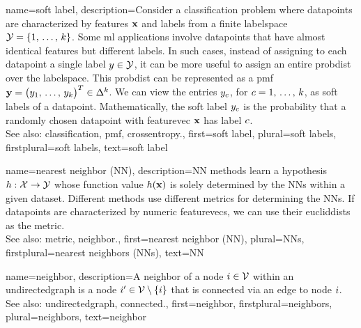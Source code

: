 {name={soft label},
	description={Consider a \gls{classification} problem where \glspl{datapoint} are characterized 
 		by \glspl{feature} ${\bf x}$ and \glspl{label} from a finite \gls{labelspace} 
		$\mathcal{Y} = \{1,\,\ldots,\,k\}$. Some \gls{ml} applications involve \glspl{datapoint} 
		that have almost identical \glspl{feature} but different \glspl{label}. In such 
		cases, instead of assigning to each \gls{datapoint} a single \gls{label} $y \in \mathcal{Y}$, 
		it can be more useful to assign an entire \gls{probdist} over the \gls{labelspace}. 
		This \gls{probdist} can be represented as a \gls{pmf} 
		${\bf y} = \big( y_{1},\,\ldots,\,y_{k}\big)^{T} \in \Delta^{k}$. 
		We can view the entries $y_{c}$, for $c=1,\,\ldots,\,k$, 
		as soft \glspl{label} of a \gls{datapoint}. Mathematically, the soft \gls{label} $y_{c}$  
		is the \gls{probability} that a randomly chosen \gls{datapoint} with \gls{featurevec} ${\bf x}$ 
		has \gls{label} $c$.
		\\
              	See also: \gls{classification}, \gls{pmf}, \gls{crossentropy}.},
 	first={soft label},
 	plural={soft labels},
 	firstplural={soft labels},
 	text={soft label}
}

{name={nearest neighbor (NN)},
	description={NN methods learn a \gls{hypothesis} 
		$h: \mathcal{X} \rightarrow \mathcal{Y}$ whose \gls{function} value $h({\bf x})$ 
		is solely determined by the NNs within a given \gls{dataset}. Different 
		methods use different \glspl{metric} for determining the NNs. If \glspl{datapoint} 
		are characterized by numeric \glspl{featurevec}, we can use their \glspl{eucliddist} as 
		the \gls{metric}.
					\\ 
		See also: \gls{metric}, \gls{neighbor}.},
	first={nearest neighbor (NN)},
	plural={NNs},
 	firstplural={nearest neighbors (NNs)},
	text={NN} 
}

{name={neighbor},
	description={A neighbor of a node $i \in \mathcal{V}$ 
		within an \gls{undirectedgraph} is a node $i' \in \mathcal{V} \setminus \{ i\}$ 
		that is \gls{connected} via an edge to node $i$.
				\\ 
		See also: \gls{undirectedgraph}, \gls{connected}.},
	first={neighbor},
	firstplural={neighbors}, 
	plural={neighbors}, 
	text={neighbor} 
}

